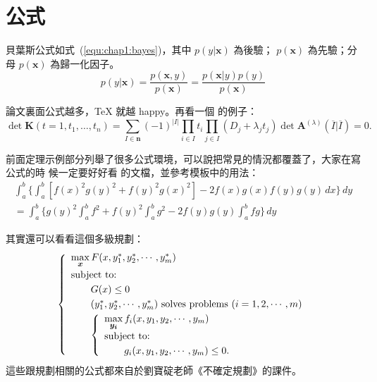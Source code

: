 \section{公式}
\label{sec:equation}
貝葉斯公式如式~(\ref{equ:chap1:bayes})，其中 $p(y|\mathbf{x})$ 為後驗；
$p(\mathbf{x})$ 為先驗；分母 $p(\mathbf{x})$ 為歸一化因子。
\begin{equation}
\label{equ:chap1:bayes}
p(y|\mathbf{x}) = \frac{p(\mathbf{x},y)}{p(\mathbf{x})}=
\frac{p(\mathbf{x}|y)p(y)}{p(\mathbf{x})} 
\end{equation}

論文裏面公式越多，\TeX{} 就越 happy。再看一個  的例子：
\newcommand{\envert}[1]{\left\lvert#1\right\rvert} 
\begin{equation}\label{detK2}
\det\mathbf{K}(t=1,t_1,\dots,t_n)=\sum_{I\in\mathbf{n}}(-1)^{\envert{I}}
\prod_{i\in I}t_i\prod_{j\in I}(D_j+\lambda_jt_j)\det\mathbf{A}
^{(\lambda)}(\overline{I}|\overline{I})=0.
\end{equation} 

前面定理示例部分列舉了很多公式環境，可以說把常見的情況都覆蓋了，大家在寫公式的時
候一定要好好看  的文檔，並參考模板中的用法：
\begin{multline*}%
\int_a^b\biggl\{\int_a^b[f(x)^2g(y)^2+f(y)^2g(x)^2]
 -2f(x)g(x)f(y)g(y)\,dx\biggr\}\,dy \\
 =\int_a^b\biggl\{g(y)^2\int_a^bf^2+f(y)^2
  \int_a^b g^2-2f(y)g(y)\int_a^b fg\biggr\}\,dy
\end{multline*}

其實還可以看看這個多級規劃：
\begin{equation}\label{bilevel}
\left\{\begin{array}{l}
\max\limits_{{\mbox{\footnotesize\boldmath $x$}}} F(x,y_1^*,y_2^*,\cdots,y_m^*)\\[0.2cm]
\mbox{subject to:}\\[0.1cm]
\qquad G(x)\le 0\\[0.1cm]
\qquad(y_1^*,y_2^*,\cdots,y_m^*)\mbox{ solves problems }(i=1,2,\cdots,m)\\[0.1cm]
\qquad\left\{\begin{array}{l}
    \max\limits_{{\mbox{\footnotesize\boldmath $y_i$}}}f_i(x,y_1,y_2,\cdots,y_m)\\[0.2cm]
    \mbox{subject to:}\\[0.1cm]
    \qquad g_i(x,y_1,y_2,\cdots,y_m)\le 0.
    \end{array}\right.
\end{array}\right.
\end{equation}
這些跟規劃相關的公式都來自於劉寶碇老師《不確定規劃》的課件。
